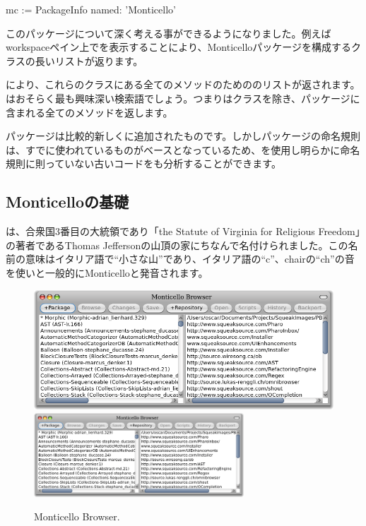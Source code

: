 \documentclass[a4paper,10pt,twoside]{book}
\begin{document}
\begin{code}{}
mc := PackageInfo named: 'Monticello'
\end{code}

このパッケージについて深く考える事ができるようになりました。例えばworkspaceペイン上でを表示することにより、Monticelloパッケージを構成するクラスの長いリストが返ります。

により、これらのクラスにある全てのメソッドのためののリストが返されます。
はおそらく最も興味深い検索語でしょう。つまりはクラスを除き、パッケージに含まれる全てのメソッドを返します。

パッケージは比較的新しく\pharo に追加されたものです。しかしパッケージの命名規則は、すでに使われているものがベースとなっているため、を使用し明らかに命名規則に則っていない古いコードをも分析することができます。


\subsection{Monticelloの基礎}

は、合衆国3番目の大統領であり「the Statute of Virginia for Religious Freedom」の著者であるThomas Jeffersonの山頂の家にちなんで名付けられました。この名前の意味はイタリア語で``小さな山''であり、イタリア語の``c''、chairの``ch''の音を使いと一般的にMonticelloと発音されます。


\begin{figure}[btp]
	\begin{center}
	\ifluluelse
		{\includegraphics[width=\textwidth]{freshMonticello}}
		{\includegraphics[width=0.7\textwidth]{freshMonticello}}
	\end{center}
	\caption{Monticello Browser.}
\end{figure}
\end{document}
